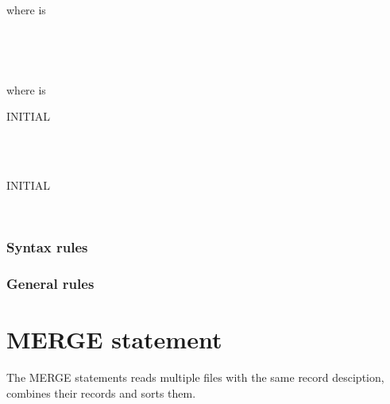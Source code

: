 where  is

\begin{syntax}
  \begin{1=}
    \identifier \\
    \literal
  \end{1=}
  \begin{1=}
    \identifier \\
    \literal
  \end{1=}
  \begin{0-1}
  \end{0-1}
\end{syntax}

where  is

\begin{syntax}
  \begin{0+}
     INITIAL
    \begin{1=}
      \identifier \\
      \literal
    \end{1=} \\

     INITIAL
    \begin{1=}
      \identifier \\
      \literal
    \end{1=}
  \end{0+}
\end{syntax}

\subsubsection{Syntax rules}

\subsubsection{General rules}

\section{MERGE statement}

The MERGE statements reads multiple files with the same record desciption, combines their records and sorts them.

